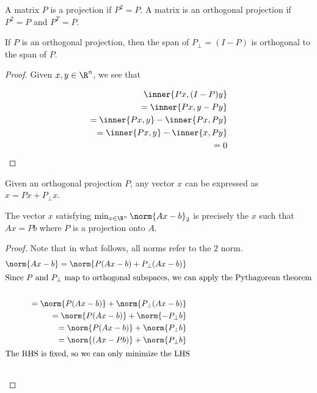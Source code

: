 \documentclass[../main.tex]{subfiles}
\begin{document}
\begin{definition}
    A matrix $P$ is a projection if $P^2 = P$. A matrix is an orthogonal projection if $P^2 = P$ and $P^T = P$.
\end{definition}

\begin{proposition}
    If $P$ is an orthogonal projection, then the span of $P_{\perp} = (I - P)$ is orthogonal to the span of $P$.
\end{proposition}
\begin{proof}
    Given $x,y \in \R^n$, we see that

    \begin{align*}
        \inner{Px, (I - P)y} \\
        = \inner{Px, y - Py} \\
        = \inner{Px, y} - \inner{Px, Py} \\
        = \inner{Px, y} - \inner{x, Py} \\
        = 0
    \end{align*}
\end{proof}

\begin{corollary}
    Given an orthogonal projection $P$, any vector $x$ can be expressed as $x = Px + P_{\perp}x$.
\end{corollary}

\begin{proposition}
    The vector $x$ satisfying $\min_{x \in \R^n} \norm{Ax - b}_2$ is precisely the $x$ such that $Ax = Pb$ where $P$ is a projection onto $A$.
\end{proposition}

\begin{proof}
    Note that in what follows, all norms refer to the $2$ norm.
    \begin{align*}
        \norm{Ax - b} = \norm{P(Ax -b) + P_{\perp}(Ax - b)} \\
        \intertext{Since $P$ and $P_{\perp}$ map to orthogonal subspaces, we can apply the Pythagorean theorem} \\
        = \norm{P(Ax -b)} + \norm{P_{\perp}(Ax - b)} \\
        = \norm{P(Ax -b)} + \norm{-P_{\perp}b} \\
        = \norm{P(Ax -b)} + \norm{P_{\perp}b} \\
        = \norm{(Ax - Pb)} + \norm{P_{\perp}b} \\
        \intertext{The RHS is fixed, so we can only minimize the LHS} \\
    \end{align*}
\end{proof}
\end{document}
